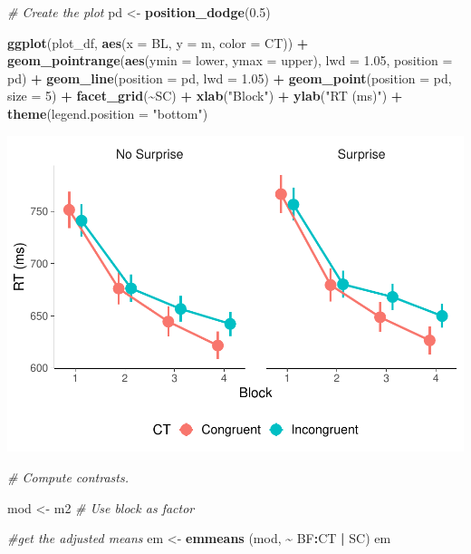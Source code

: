 \documentclass[
]{article}
\newenvironment{Shaded}{\begin{snugshade}}{\end{snugshade}}
\newcommand{\AttributeTok}[1]{\textcolor[rgb]{0.13,0.29,0.53}{#1}}
\newcommand{\CommentTok}[1]{\textcolor[rgb]{0.56,0.35,0.01}{\textit{#1}}}
\newcommand{\DecValTok}[1]{\textcolor[rgb]{0.00,0.00,0.81}{#1}}
\newcommand{\FloatTok}[1]{\textcolor[rgb]{0.00,0.00,0.81}{#1}}
\newcommand{\FunctionTok}[1]{\textcolor[rgb]{0.13,0.29,0.53}{\textbf{#1}}}
\newcommand{\NormalTok}[1]{#1}
\newcommand{\OtherTok}[1]{\textcolor[rgb]{0.56,0.35,0.01}{#1}}
\newcommand{\SpecialCharTok}[1]{\textcolor[rgb]{0.81,0.36,0.00}{\textbf{#1}}}
\newcommand{\StringTok}[1]{\textcolor[rgb]{0.31,0.60,0.02}{#1}}
\begin{document}
\begin{Shaded}
\begin{Highlighting}[]
\CommentTok{\# Create the plot}
\NormalTok{pd }\OtherTok{\textless{}{-}} \FunctionTok{position\_dodge}\NormalTok{(}\FloatTok{0.5}\NormalTok{)}

\FunctionTok{ggplot}\NormalTok{(plot\_df, }\FunctionTok{aes}\NormalTok{(}\AttributeTok{x =}\NormalTok{ BL, }\AttributeTok{y =}\NormalTok{ m, }\AttributeTok{color =}\NormalTok{ CT)) }\SpecialCharTok{+}
  \FunctionTok{geom\_pointrange}\NormalTok{(}\FunctionTok{aes}\NormalTok{(}\AttributeTok{ymin =}\NormalTok{ lower, }\AttributeTok{ymax =}\NormalTok{ upper), }\AttributeTok{lwd =} \FloatTok{1.05}\NormalTok{, }\AttributeTok{position =}\NormalTok{ pd) }\SpecialCharTok{+}
  \FunctionTok{geom\_line}\NormalTok{(}\AttributeTok{position =}\NormalTok{ pd, }\AttributeTok{lwd =} \FloatTok{1.05}\NormalTok{) }\SpecialCharTok{+}
  \FunctionTok{geom\_point}\NormalTok{(}\AttributeTok{position =}\NormalTok{ pd, }\AttributeTok{size =} \DecValTok{5}\NormalTok{) }\SpecialCharTok{+}
  \FunctionTok{facet\_grid}\NormalTok{(}\SpecialCharTok{\textasciitilde{}}\NormalTok{SC) }\SpecialCharTok{+}
  \FunctionTok{xlab}\NormalTok{(}\StringTok{"Block"}\NormalTok{) }\SpecialCharTok{+}
  \FunctionTok{ylab}\NormalTok{(}\StringTok{"RT (ms)"}\NormalTok{) }\SpecialCharTok{+}
  \FunctionTok{theme}\NormalTok{(}\AttributeTok{legend.position =} \StringTok{"bottom"}\NormalTok{)}
\end{Highlighting}
\end{Shaded}

\includegraphics{20_variational_inference_files/figure-latex/unnamed-chunk-17-2.pdf}

\begin{Shaded}
\begin{Highlighting}[]
\CommentTok{\# Compute contrasts.}

\NormalTok{mod }\OtherTok{\textless{}{-}}\NormalTok{ m2  }\CommentTok{\# Use block as factor}

\CommentTok{\#get the adjusted means}
\NormalTok{em }\OtherTok{\textless{}{-}} \FunctionTok{emmeans}\NormalTok{ (mod, }\SpecialCharTok{\textasciitilde{}}\NormalTok{ BF}\SpecialCharTok{:}\NormalTok{CT }\SpecialCharTok{|}\NormalTok{ SC)}
\NormalTok{em}
\end{Highlighting}
\end{Shaded}
\end{document}

